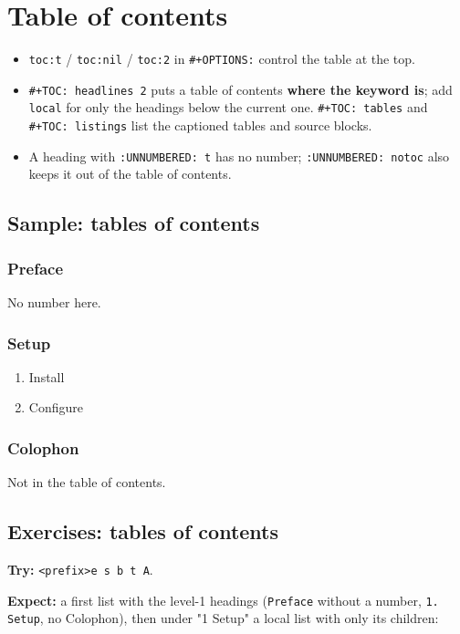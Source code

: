\section{Table of contents}
\label{sec:org4bff50b}
\begin{itemize}
\item \texttt{toc:t} / \texttt{toc:nil} / \texttt{toc:2} in \texttt{\#+OPTIONS:} control the table at the
top.
\item \texttt{\#+TOC: headlines 2} puts a table of contents \textbf{where the keyword is};
add \texttt{local} for only the headings below the current one. \texttt{\#+TOC: tables}
and \texttt{\#+TOC: listings} list the captioned tables and source blocks.
\item A heading with \texttt{:UNNUMBERED: t} has no number; \texttt{:UNNUMBERED: notoc} also
keeps it out of the table of contents.
\end{itemize}
\subsection{Sample: tables of contents}
\label{sec:orgaeccd88}
\setcounter{tocdepth}{1}
\tableofcontents
\subsubsection*{Preface}
\label{sec:org2f1a4d1}
No number here.
\subsubsection{Setup}
\label{sec:orga155296}
\startcontents[level-3]
\begin{enumerate}
\item Install
\label{sec:org610520a}
\item Configure
\label{sec:orgfc3831a}
\end{enumerate}
\stopcontents[level-3]
\subsubsection*{Colophon}
\label{sec:orgce08296}
Not in the table of contents.
\subsection{Exercises: tables of contents}
\label{sec:org4373b75}
\textbf{Try:} \texttt{<prefix>e s b t A}.

\textbf{Expect:} a first list with the level-1 headings (\texttt{Preface} without a
number, \texttt{1. Setup}, no Colophon), then under "1 Setup" a local list with
only its children:

